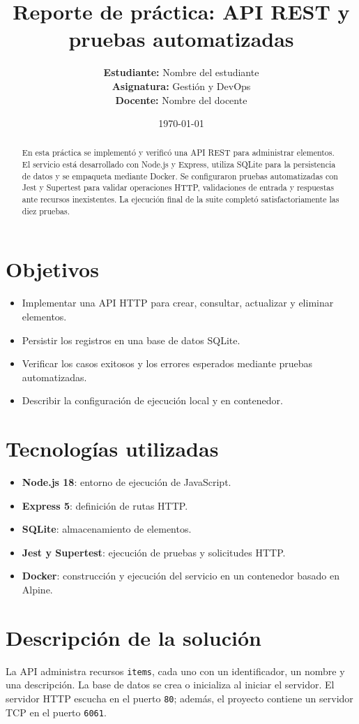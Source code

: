 \documentclass[12pt,a4paper]{article}
\title{Reporte de práctica: API REST y pruebas automatizadas}
\author{\textbf{Estudiante:} Nombre del estudiante\\
        \textbf{Asignatura:} Gestión y DevOps\\
        \textbf{Docente:} Nombre del docente}
\date{\today}
\begin{document}
\maketitle

\begin{abstract}
En esta práctica se implementó y verificó una API REST para administrar elementos. El servicio está desarrollado con Node.js y Express, utiliza SQLite para la persistencia de datos y se empaqueta mediante Docker. Se configuraron pruebas automatizadas con Jest y Supertest para validar operaciones HTTP, validaciones de entrada y respuestas ante recursos inexistentes. La ejecución final de la suite completó satisfactoriamente las diez pruebas.
\end{abstract}

\section{Objetivos}
\begin{itemize}[leftmargin=*]
  \item Implementar una API HTTP para crear, consultar, actualizar y eliminar elementos.
  \item Persistir los registros en una base de datos SQLite.
  \item Verificar los casos exitosos y los errores esperados mediante pruebas automatizadas.
  \item Describir la configuración de ejecución local y en contenedor.
\end{itemize}

\section{Tecnologías utilizadas}
\begin{itemize}[leftmargin=*]
  \item \textbf{Node.js 18}: entorno de ejecución de JavaScript.
  \item \textbf{Express 5}: definición de rutas HTTP.
  \item \textbf{SQLite}: almacenamiento de elementos.
  \item \textbf{Jest y Supertest}: ejecución de pruebas y solicitudes HTTP.
  \item \textbf{Docker}: construcción y ejecución del servicio en un contenedor basado en Alpine.
\end{itemize}

\section{Descripción de la solución}
La API administra recursos \texttt{items}, cada uno con un identificador, un nombre y una descripción. La base de datos se crea o inicializa al iniciar el servidor. El servidor HTTP escucha en el puerto \texttt{80}; además, el proyecto contiene un servidor TCP en el puerto \texttt{6061}.
\end{document}
